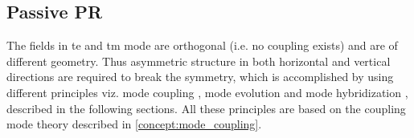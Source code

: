 \documentclass[../report.tex]{subfiles}
\begin{document}
		\subsection{Passive PR}
The fields in \gls{te} and \gls{tm} mode are orthogonal (i.e. no coupling exists) and are of different geometry. Thus asymmetric structure in both horizontal and vertical directions are required to break the symmetry, which is accomplished by using different principles viz. mode coupling \cite{dai_novel_2011,ding_Integrated_2013,wang_design_2014}, mode evolution \cite{zhang_selected_2010,chen_compact_2011,zhang_efficient_2012,justin_conference_2012,kazuhiro_integrated_2015} and mode hybridization \cite{fukuda_integrated_2008,leung_numerical_2011,vermeulen_Silicon_2012,velasco_ultracompact_2012}, described in the following sections. All these principles are based on the coupling mode theory described in \ref{concept:mode_coupling}.
			
\end{document}
